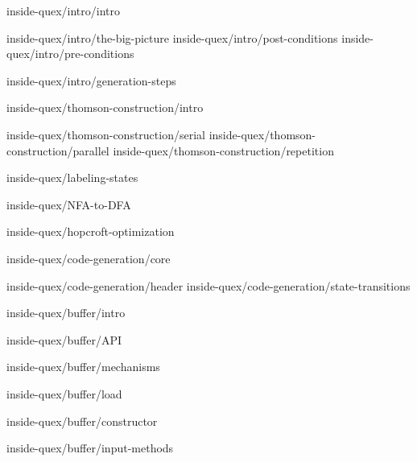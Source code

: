 \documentclass{scrbook}
\def\quex{{que{\raise 0.2em \hbox{$\chi$}}}}
\def\Quex{{Que{\raise 0.2em \hbox{$\chi$}}}}
\begin{document}
	    {inside-quex/intro/intro}

               {inside-quex/intro/the-big-picture}
                  {inside-quex/intro/post-conditions}
                  {inside-quex/intro/pre-conditions}

               {inside-quex/intro/generation-steps}

	    {inside-quex/thomson-construction/intro}
	  
  	          {inside-quex/thomson-construction/serial}
	          {inside-quex/thomson-construction/parallel}
	          {inside-quex/thomson-construction/repetition}

            {inside-quex/labeling-states}  

            {inside-quex/NFA-to-DFA}

	    {inside-quex/hopcroft-optimization}

            {inside-quex/code-generation/core}
	  
                  {inside-quex/code-generation/header}    
                  {inside-quex/code-generation/state-transitions}    

          {inside-quex/buffer/intro}

	      {inside-quex/buffer/API}

	      {inside-quex/buffer/mechanisms}
	      
	      {inside-quex/buffer/load}
	      
	      {inside-quex/buffer/constructor}

              {inside-quex/buffer/input-methods}



\end{document}
